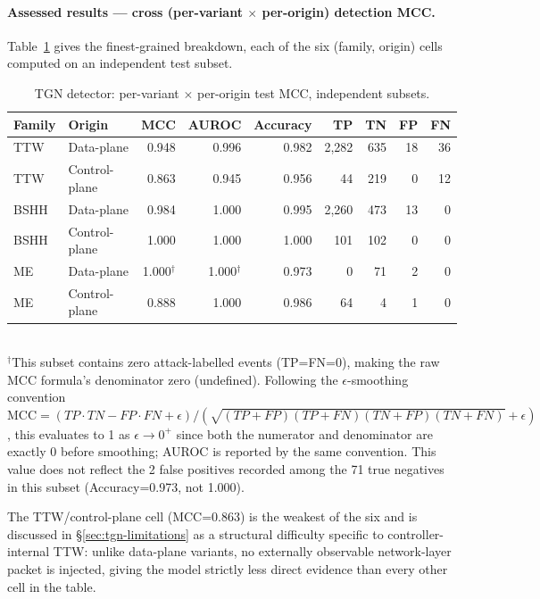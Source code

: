 \paragraph{Assessed results --- cross (per-variant $\times$ per-origin) detection MCC.}
Table~\ref{tab:tgn-val2-cross-mcc} gives the finest-grained breakdown,
each of the six (family, origin) cells computed on an independent test
subset.

\begin{table}[htbp]
\centering
\caption{TGN detector: per-variant $\times$ per-origin test MCC, independent subsets.}
\label{tab:tgn-val2-cross-mcc}
\begin{tabular}{@{}llrrrrrrr@{}}
\toprule
Family & Origin & MCC & AUROC & Accuracy & TP & TN & FP & FN \\
\midrule
TTW  & Data-plane    & 0.948 & 0.996 & 0.982 & 2{,}282 & 635 & 18 & 36 \\
TTW  & Control-plane & 0.863 & 0.945 & 0.956 & 44      & 219 & 0  & 12 \\
BSHH & Data-plane    & 0.984 & 1.000 & 0.995 & 2{,}260 & 473 & 13 & 0  \\
BSHH & Control-plane & 1.000 & 1.000 & 1.000 & 101     & 102 & 0  & 0  \\
ME   & Data-plane    & 1.000$^\dagger$ & 1.000$^\dagger$ & 0.973 & 0       & 71  & 2  & 0  \\
ME   & Control-plane & 0.888 & 1.000 & 0.986 & 64      & 4   & 1  & 0  \\
\bottomrule
\end{tabular}
\\[2pt]
\footnotesize{$^\dagger$This subset contains zero attack-labelled events
(TP=FN=0), making the raw MCC formula's denominator zero (undefined).
Following the $\epsilon$-smoothing convention
$\text{MCC}=(TP{\cdot}TN-FP{\cdot}FN+\epsilon)/(\sqrt{(TP{+}FP)(TP{+}FN)(TN{+}FP)(TN{+}FN)}+\epsilon)$,
this evaluates to 1 as $\epsilon\to0^+$ since both the numerator and
denominator are exactly 0 before smoothing; AUROC is reported by the same
convention. This value does not reflect the 2 false positives recorded
among the 71 true negatives in this subset (Accuracy=0.973, not 1.000).}
\end{table}

The TTW/control-plane cell (MCC=0.863) is the weakest of the six and is
discussed in \S\ref{sec:tgn-limitations} as a structural difficulty
specific to controller-internal TTW: unlike data-plane variants, no
externally observable network-layer packet is injected, giving the model
strictly less direct evidence than every other cell in the table.

